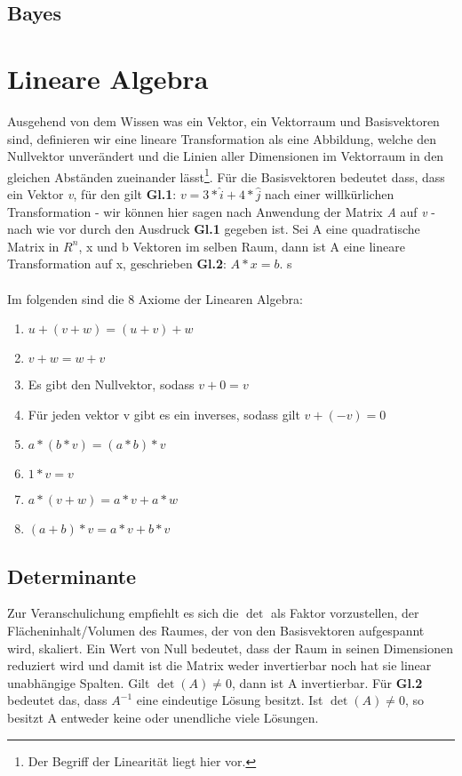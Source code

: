 \documentclass[letterpaper, titlepage]{article}
\begin{document}
\subsection{Bayes}\label{Bayes}
\section{Lineare Algebra}\label{Lineare Algebra}
Ausgehend von dem Wissen was ein Vektor, ein Vektorraum und Basisvektoren sind, definieren wir eine lineare Transformation als eine Abbildung, welche den Nullvektor unverändert und die Linien aller Dimensionen im Vektorraum in den gleichen Abständen zueinander lässt\footnote[1]{Der Begriff der Linearität liegt hier vor.}. Für die Basisvektoren bedeutet dass, dass ein Vektor \textit{v}, für den gilt \textbf{Gl.1}: $v=3*\hat{i}+4*\hat{j}$ nach einer willkürlichen Transformation - wir können hier sagen nach Anwendung der Matrix \textit{A} auf \textit{v} - nach wie vor durch den Ausdruck \textbf{Gl.1} gegeben ist. Sei A eine quadratische Matrix in $R^n$, x und b Vektoren im selben Raum, dann ist A eine lineare Transformation auf x, geschrieben \textbf{Gl.2}: $A*x=b$. s
\\
\vspace{0.1cm}
\\
Im folgenden sind die 8 Axiome der Linearen Algebra:
\begin{enumerate}
    \item $u+(v+w)=(u+v)+w$
    \item $v+w=w+v$
    \item Es gibt den Nullvektor, sodass $v+0=v$
    \item Für jeden vektor v gibt es ein inverses, sodass gilt $v+(-v)=0$
    \item $a*(b*v)=(a*b)*v$
    \item $1*v=v$
    \item $a*(v+w)=a*v+a*w$
    \item $(a+b)*v=a*v+b*v$
\end{enumerate}
\subsection{Determinante}\label{Determinante}
Zur Veranschulichung empfiehlt es sich die $\det$ als Faktor vorzustellen, der Flächeninhalt/Volumen des Raumes, der von den Basisvektoren aufgespannt wird, skaliert. Ein Wert von Null bedeutet, dass der Raum in seinen Dimensionen reduziert wird und damit ist die Matrix weder invertierbar noch hat sie linear unabhängige Spalten. Gilt $\det(A)\neq0$, dann ist A invertierbar. Für \textbf{Gl.2} bedeutet das, dass $A^{-1}$ eine eindeutige Lösung besitzt. Ist $\det(A)\neq0$, so besitzt A entweder keine oder unendliche viele Lösungen.
\end{document}
